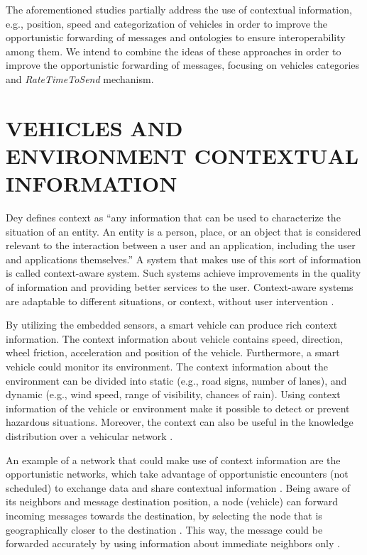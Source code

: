 \documentclass[letterpaper, 10 pt, conference]{ieeeconf}  %
\begin{document}
The aforementioned studies partially address the use of contextual information, e.g., position, speed and categorization of vehicles in order to improve the opportunistic forwarding of messages and ontologies to ensure interoperability among them. We intend to combine the ideas of these approaches in order to improve the opportunistic forwarding of messages, focusing on vehicles categories and \emph{RateTimeToSend} mechanism.

\section{VEHICLES AND ENVIRONMENT CONTEXTUAL INFORMATION}

Dey \cite{dey2001} defines context as “any information that can be used to characterize the situation of an entity. An entity is a person, place, or an object that is considered relevant to the interaction between a user and an application, including the user and applications themselves.” A system that makes use of this sort of information is called context-aware system. Such systems achieve improvements in the quality of information and providing better services to the user. Context-aware systems are adaptable to  different situations, or context, without user intervention \cite{baldauf2007}.

By utilizing the embedded sensors, a smart vehicle can produce rich context information. The context information about vehicle contains speed, direction, wheel friction, acceleration and position of the vehicle. Furthermore, a smart vehicle could monitor its environment. The context information about the environment can be divided into static (e.g., road signs, number of lanes), and dynamic (e.g., wind speed, range of visibility, chances of rain). Using context information of the vehicle or environment make it possible to detect or prevent hazardous situations. Moreover, the context can also be useful in the knowledge distribution over a vehicular network \cite{tocadas2010}.

An example of a network that could make use of context information are the opportunistic networks, which take advantage of opportunistic encounters (not scheduled) to exchange data and share contextual information  \cite{geoopp2014}. Being aware of its neighbors and message destination position, a node (vehicle) can forward incoming messages towards the destination, by selecting the node that is geographically closer to the destination \cite{gpsr2000}. This way, the message could be forwarded accurately by using information about immediate neighbors only \cite{magf2009}.
\end{document}
